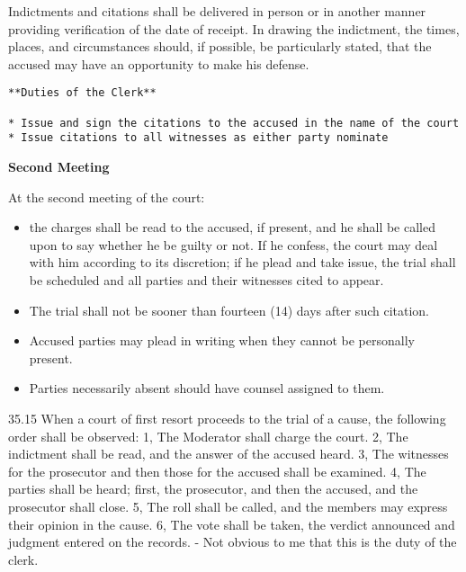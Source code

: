 \documentclass[
]{book}
\providecommand{\tightlist}{%
  \setlength{\itemsep}{0pt}\setlength{\parskip}{0pt}}
\begin{document}
Indictments and citations shall be delivered in person or in another manner providing verification of the date of receipt. In drawing the indictment, the times, places, and circumstances should, if possible, be particularly stated, that the accused may have an opportunity to make his defense.

\begin{verbatim}
**Duties of the Clerk**

* Issue and sign the citations to the accused in the name of the court
* Issue citations to all witnesses as either party nominate
\end{verbatim}

\textbf{Second Meeting}

At the second meeting of the court:

\begin{itemize}
\tightlist
\item
  the charges shall be read to the accused, if present, and he shall be called upon to say whether he be guilty or not. If he confess, the court may deal with him according to its discretion; if he plead and take issue, the trial shall be scheduled and all parties and their witnesses cited to appear.
\item
  The trial shall not be sooner than fourteen (14) days after such citation.
\item
  Accused parties may plead in writing when they cannot be personally present.
\item
  Parties necessarily absent should have counsel assigned to them.
\end{itemize}

35.15 When a court of first resort proceeds to the trial of a cause, the following order shall be observed: 1, The Moderator shall charge the court. 2, The indictment shall be read, and the answer of the accused heard. 3, The witnesses for the prosecutor and then those for the accused shall be examined. 4, The parties shall be heard; first, the prosecutor, and then the accused, and the prosecutor shall close. 5, The roll shall be called, and the members may express their opinion in the cause. 6, The vote shall be taken, the verdict announced and judgment entered on the records. - Not obvious to me that this is the duty of the clerk.
\end{document}
